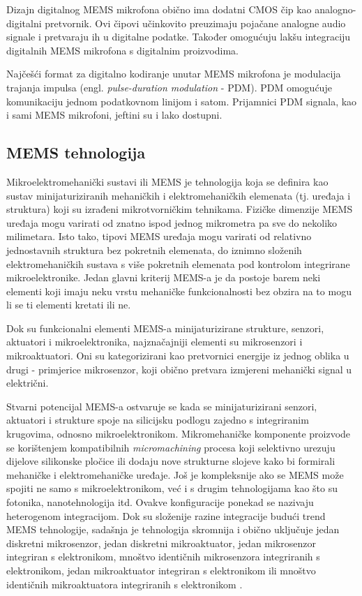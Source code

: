 Dizajn digitalnog MEMS mikrofona obično ima dodatni CMOS čip kao analogno-digitalni pretvornik. Ovi čipovi učinkovito preuzimaju pojačane analogne audio signale i pretvaraju ih u digitalne podatke. Također omogućuju lakšu integraciju digitalnih MEMS mikrofona s digitalnim proizvodima.

Najčešći format za digitalno kodiranje unutar MEMS mikrofona je modulacija trajanja impulsa (engl. \textit{pulse-duration modulation} - PDM). PDM omogućuje komunikaciju jednom podatkovnom linijom i satom. Prijamnici PDM signala, kao i sami MEMS mikrofoni, jeftini su i lako dostupni.

\subsection{MEMS tehnologija}
Mikroelektromehanički sustavi ili MEMS je tehnologija koja se definira kao sustav minijaturiziranih mehaničkih i elektromehaničkih elemenata (tj. uređaja i struktura) koji su izrađeni mikrotvorničkim tehnikama. Fizičke dimenzije MEMS uređaja mogu varirati od znatno ispod jednog mikrometra pa sve do nekoliko milimetara. Isto tako, tipovi MEMS uređaja mogu varirati od relativno jednostavnih struktura bez pokretnih elemenata, do iznimno složenih elektromehaničkih sustava s više pokretnih elemenata pod kontrolom integrirane mikroelektronike. Jedan glavni kriterij MEMS-a je da postoje barem neki elementi koji imaju neku vrstu mehaničke funkcionalnosti bez obzira na to mogu li se ti elementi kretati ili ne.

Dok su funkcionalni elementi MEMS-a minijaturizirane strukture, senzori, aktuatori i mikroelektronika, najznačajniji elementi su mikrosenzori i mikroaktuatori. Oni su  kategorizirani kao pretvornici energije iz jednog oblika u drugi - primjerice mikrosenzor, koji obično pretvara izmjereni mehanički signal u električni.

Stvarni potencijal MEMS-a ostvaruje se kada se minijaturizirani senzori, aktuatori i strukture spoje na silicijsku podlogu zajedno s integriranim krugovima, odnosno mikroelektronikom. Mikromehaničke komponente proizvode se korištenjem kompatibilnih \textit{micromachining} procesa koji selektivno urezuju dijelove silikonske pločice ili dodaju nove strukturne slojeve kako bi formirali mehaničke i elektromehaničke uređaje. Još je kompleksnije ako se MEMS može spojiti ne samo s mikroelektronikom, već i s drugim tehnologijama kao što su fotonika, nanotehnologija itd. Ovakve konfiguracije ponekad se nazivaju heterogenom integracijom. Dok su složenije razine integracije budući trend MEMS tehnologije, sadašnja je tehnologija skromnija i obično uključuje jedan diskretni mikrosenzor, jedan diskretni mikroaktuator, jedan mikrosenzor integriran s elektronikom, mnoštvo identičnih mikrosenzora integriranih s elektronikom, jedan mikroaktuator integriran s elektronikom ili mnoštvo identičnih mikroaktuatora integriranih s elektronikom \cite{whatismems_tech}. 
 

